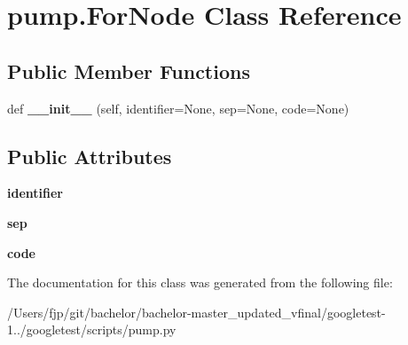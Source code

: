 \hypertarget{classpump_1_1_for_node}{}\section{pump.\+For\+Node Class Reference}
\label{classpump_1_1_for_node}
\subsection*{Public Member Functions}
\begin{DoxyCompactItemize}
\item 
\mbox{\label{classpump_1_1_for_node_a9cf60468cacdb06acce35074ab2a2b55}} 
def {\bfseries \+\_\+\+\_\+init\+\_\+\+\_\+} (self, identifier=None, sep=None, code=None)
\end{DoxyCompactItemize}
\subsection*{Public Attributes}
\begin{DoxyCompactItemize}
\item 
\mbox{\label{classpump_1_1_for_node_a2444199e135e43696b3a006bd0d38982}} 
{\bfseries identifier}
\item 
\mbox{\label{classpump_1_1_for_node_a06b493278b3c1ad53363a2bcc3b8efb3}} 
{\bfseries sep}
\item 
\mbox{\label{classpump_1_1_for_node_afdb5f4f2a3bc772bbc6ea777dfde898e}} 
{\bfseries code}
\end{DoxyCompactItemize}


The documentation for this class was generated from the following file\+:\begin{DoxyCompactItemize}
\item 
/\+Users/fjp/git/bachelor/bachelor-\/master\+\_\+updated\+\_\+vfinal/googletest-\/1../googletest/scripts/pump.\+py\end{DoxyCompactItemize}
